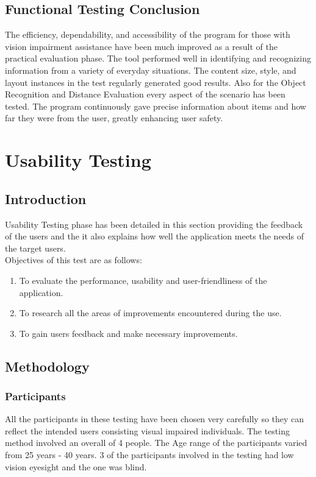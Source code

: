 \documentclass[MScCS]{uccthesis}
\begin{document}
\subsection{Functional Testing Conclusion}

The efficiency, dependability, and accessibility of the program for those with vision impairment assistance have been much improved as a result of the practical evaluation phase. The tool performed well in identifying and recognizing information from a variety of everyday situations. The content size, style, and layout instances in the test regularly generated good results. Also for the Object Recognition and Distance Evaluation every aspect of the scenario has been tested. The program continuously gave precise information about items and how far they were from the user, greatly enhancing user safety.


\section{Usability Testing}
\subsection{Introduction}

Usability Testing phase has been detailed in this section providing the feedback of the users and the it also explains how well the application meets the needs of the target users.
\\Objectives of this test are as follows:
\begin{enumerate}
    \item To evaluate the performance, usability and user-friendliness of the application.
    \item To research all the areas of improvements encountered during the use.
    \item To gain users feedback and make necessary improvements.
\end{enumerate}

\subsection{Methodology}
\subsubsection{Participants}
All the participants in these testing have been chosen very carefully so they can reflect the intended users consisting visual impaired individuals. The testing method involved an overall of 4 people. The Age range of the participants varied from 25 years - 40 years. 3 of the participants involved in the testing had low vision eyesight and the one was blind. 
\end{document}
